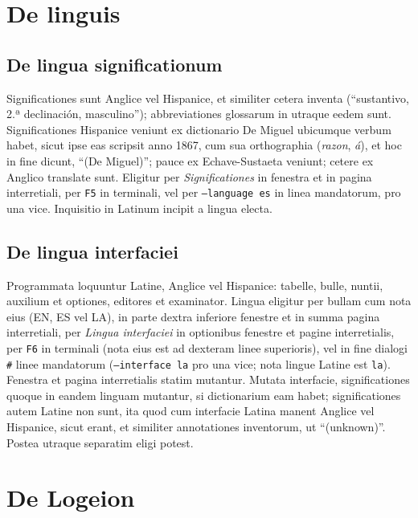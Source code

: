 \documentclass[12pt,
              article,
              oneside
              ]{memoir}
\newcommand*{\menu}[1]{\textit{#1}}
\newcommand*{\key}[1]{\texttt{#1}}
\begin{document}
\section{De linguis}
\label{sec:languages}

\subsection{De lingua significationum}

%
Significationes sunt Anglice vel Hispanice, et similiter cetera inventa
(\enquote{sustantivo, 2.ª declinación, masculino}); abbreviationes
glossarum in utraque eedem sunt. Significationes Hispanice veniunt ex
dictionario De Miguel ubicumque verbum habet, sicut ipse eas scripsit
anno 1867, cum sua orthographia (\textit{razon}, \textit{á}), et hoc in
fine dicunt, \enquote{(De Miguel)}; pauce ex Echave-Sustaeta veniunt;
cetere ex Anglico translate sunt. Eligitur per \menu{Significationes} in
fenestra et in pagina interretiali, per \key{F5} in terminali, vel per
\texttt{--language es} in linea mandatorum, pro una vice. Inquisitio in
Latinum incipit a lingua electa.

\subsection{De lingua interfaciei}

%
Programmata loquuntur Latine, Anglice vel Hispanice: tabelle, bulle,
nuntii, auxilium et optiones, editores et examinator. Lingua eligitur
per bullam cum nota eius (EN, ES vel LA), in parte dextra inferiore
fenestre et in summa pagina interretiali, per \menu{Lingua interfaciei}
in optionibus fenestre et pagine interretialis, per \key{F6} in
terminali (nota eius est ad dexteram linee superioris), vel in fine dialogi
\texttt{\#} linee mandatorum (\texttt{--interface la} pro una vice; nota
lingue Latine est \texttt{la}). Fenestra et pagina interretialis statim
mutantur. Mutata interfacie, significationes quoque in eandem linguam
mutantur, si dictionarium eam habet; significationes autem Latine non
sunt, ita quod cum interfacie Latina manent Anglice vel Hispanice, sicut
erant, et similiter annotationes inventorum, ut \enquote{(unknown)}.
Postea utraque separatim eligi potest.

\section{De Logeion}
\label{sec:logeion}
\end{document}

